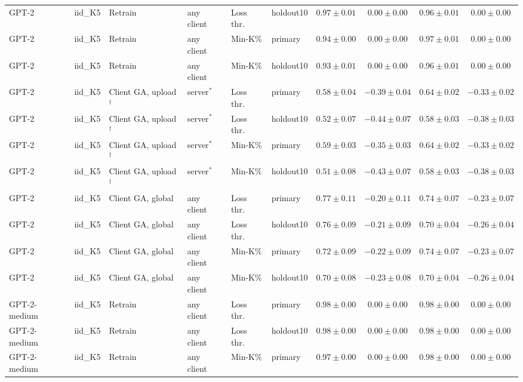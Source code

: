 \begin{table}[t]
\begin{tabular*}{\textwidth}{@{\extracolsep{\fill}}llllllcccc@{}}
GPT-2 & iid\_K5 & Retrain & any client & Loss thr. & holdout10 & $0.97 \pm 0.01$ & $0.00 \pm 0.00$ & $0.96 \pm 0.01$ & $0.00 \pm 0.00$ \\
GPT-2 & iid\_K5 & Retrain & any client & Min-K\% & primary & $0.94 \pm 0.00$ & $0.00 \pm 0.00$ & $0.97 \pm 0.01$ & $0.00 \pm 0.00$ \\
GPT-2 & iid\_K5 & Retrain & any client & Min-K\% & holdout10 & $0.93 \pm 0.01$ & $0.00 \pm 0.00$ & $0.96 \pm 0.01$ & $0.00 \pm 0.00$ \\
GPT-2 & iid\_K5 & Client GA, upload$^{\dagger}$ & server$^{*}$ & Loss thr. & primary & $0.58 \pm 0.04$ & $-0.39 \pm 0.04$ & $0.64 \pm 0.02$ & $-0.33 \pm 0.02$ \\
GPT-2 & iid\_K5 & Client GA, upload$^{\dagger}$ & server$^{*}$ & Loss thr. & holdout10 & $0.52 \pm 0.07$ & $-0.44 \pm 0.07$ & $0.58 \pm 0.03$ & $-0.38 \pm 0.03$ \\
GPT-2 & iid\_K5 & Client GA, upload$^{\dagger}$ & server$^{*}$ & Min-K\% & primary & $0.59 \pm 0.03$ & $-0.35 \pm 0.03$ & $0.64 \pm 0.02$ & $-0.33 \pm 0.02$ \\
GPT-2 & iid\_K5 & Client GA, upload$^{\dagger}$ & server$^{*}$ & Min-K\% & holdout10 & $0.51 \pm 0.08$ & $-0.43 \pm 0.07$ & $0.58 \pm 0.03$ & $-0.38 \pm 0.03$ \\
GPT-2 & iid\_K5 & Client GA, global & any client & Loss thr. & primary & $0.77 \pm 0.11$ & $-0.20 \pm 0.11$ & $0.74 \pm 0.07$ & $-0.23 \pm 0.07$ \\
GPT-2 & iid\_K5 & Client GA, global & any client & Loss thr. & holdout10 & $0.76 \pm 0.09$ & $-0.21 \pm 0.09$ & $0.70 \pm 0.04$ & $-0.26 \pm 0.04$ \\
GPT-2 & iid\_K5 & Client GA, global & any client & Min-K\% & primary & $0.72 \pm 0.09$ & $-0.22 \pm 0.09$ & $0.74 \pm 0.07$ & $-0.23 \pm 0.07$ \\
GPT-2 & iid\_K5 & Client GA, global & any client & Min-K\% & holdout10 & $0.70 \pm 0.08$ & $-0.23 \pm 0.08$ & $0.70 \pm 0.04$ & $-0.26 \pm 0.04$ \\
GPT-2-medium & iid\_K5 & Retrain & any client & Loss thr. & primary & $0.98 \pm 0.00$ & $0.00 \pm 0.00$ & $0.98 \pm 0.00$ & $0.00 \pm 0.00$ \\
GPT-2-medium & iid\_K5 & Retrain & any client & Loss thr. & holdout10 & $0.98 \pm 0.00$ & $0.00 \pm 0.00$ & $0.98 \pm 0.00$ & $0.00 \pm 0.00$ \\
GPT-2-medium & iid\_K5 & Retrain & any client & Min-K\% & primary & $0.97 \pm 0.00$ & $0.00 \pm 0.00$ & $0.98 \pm 0.00$ & $0.00 \pm 0.00$ \\

\end{tabular*}
\end{table}
